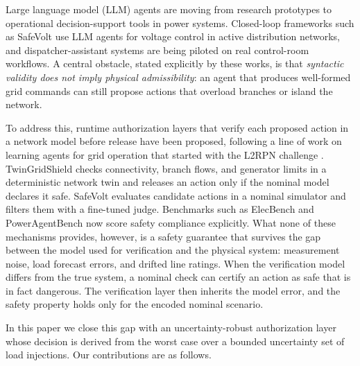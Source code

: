 \documentclass[journal]{IEEEtran}
\begin{document}
Large language model (LLM) agents are moving from research prototypes to operational
decision-support tools in power systems. Closed-loop frameworks such as SafeVolt
\cite{safevolt2026} use LLM agents for voltage control in active distribution
networks, and dispatcher-assistant systems are being piloted on real control-room
workflows. A central obstacle, stated explicitly by these works, is that
\textit{syntactic validity does not imply physical admissibility}: an agent that
produces well-formed grid commands can still propose actions that overload
branches or island the network.

To address this, runtime authorization layers that verify each proposed action in
a network model before release have been proposed, following a line of work on
learning agents for grid operation that started with the L2RPN challenge
\cite{marot2022}. TwinGridShield
\cite{twingridshield2026} checks connectivity, branch flows, and generator limits
in a deterministic network twin and releases an action only if the nominal model
declares it safe. SafeVolt \cite{safevolt2026} evaluates candidate actions in a
nominal simulator and filters them with a fine-tuned judge. Benchmarks such as
ElecBench \cite{elecbench2025} and PowerAgentBench \cite{poweragentbenchss2026,poweragentbenchdyn2026}
now score safety compliance explicitly. What none of these mechanisms provides,
however, is a safety guarantee that survives the gap between the model used for
verification and the physical system: measurement noise, load forecast errors,
and drifted line ratings. When the verification model differs from the true
system, a nominal check can certify an action as safe that is in fact dangerous.
The verification layer then inherits the model error, and the safety property
holds only for the encoded nominal scenario.

In this paper we close this gap with an uncertainty-robust authorization layer
whose decision is derived from the worst case over a bounded uncertainty set of
load injections. Our contributions are as follows.
\end{document}

